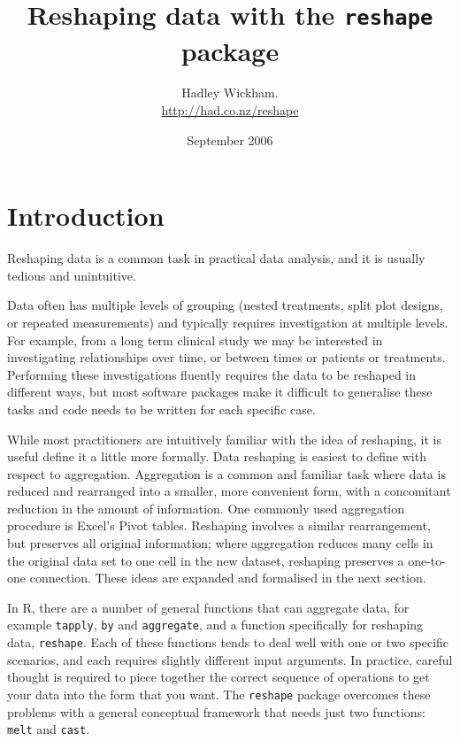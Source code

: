 \documentclass[oneside,letterpaper]{scrartcl}
\title{Reshaping data with the {\tt reshape} package}
\author{Hadley Wickham. \\
\url{http://had.co.nz/reshape}}
\date{September 2006}
\begin{document}
\maketitle
\setcounter{tocdepth}{2}
\tableofcontents
\newpage

\section{Introduction}




Reshaping data is a common task in practical data analysis, and it is usually tedious and unintuitive.  

Data often has multiple levels of grouping (nested treatments, split plot designs, or repeated measurements) and typically requires investigation at multiple levels. For example, from a long term clinical study we may be interested in investigating relationships over time, or between times or patients or treatments. Performing these investigations fluently requires the data to be reshaped in different ways, but most software packages make it difficult to generalise these tasks and code needs to be written for each specific case. 

While most practitioners are intuitively familiar with the idea of reshaping, it is useful define it a little more formally.  Data reshaping is easiest to define with respect to aggregation.  Aggregation is a common and familiar task where data is reduced and rearranged into a smaller, more convenient form, with a concomitant reduction in the amount of information.  One commonly used aggregation procedure is Excel's Pivot tables.  Reshaping involves a similar rearrangement, but preserves all original information; where aggregation reduces many cells in the original data set to one cell in the new dataset, reshaping preserves a one-to-one connection.   These ideas are expanded and formalised in the next section. 

In R, there are a number of general functions that can aggregate data, for example {\tt tapply}, {\tt by} and {\tt aggregate}, and a function specifically for reshaping data, {\tt reshape}.  Each of these functions tends to deal well with one or two specific scenarios, and each requires slightly different input arguments.  In practice, careful thought is required to piece together the correct sequence of operations to get your data into the form that you want.  The {\tt reshape} package overcomes these problems with a general conceptual framework that needs just two functions: {\tt melt} and {\tt cast}.
\end{document}
